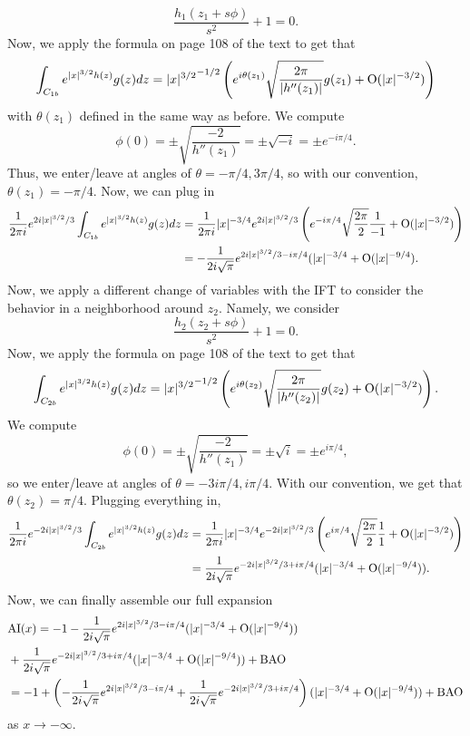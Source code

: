 \documentclass{article}
\begin{document}
\[
\frac{h_1(z_1+s\phi)}{s^2}+1=0.
\]
Now, we apply the formula on page 108 of the text to get that 
\[
\int_{C_{1b}}e^{|x|^{3/2}h(z)}g(z)dz={|x|^{3/2}}^{-1/2}\left(e^{i\theta(z_1)}\sqrt{\frac{2\pi}{|h''(z_1)|}}g(z_1)+\operatorname{O}(|x|^{-3/2})\right)
\]
with $\theta(z_1)$ defined in the same way as before. We compute
\[
\phi(0)=\pm\sqrt{\frac{-2}{h''(z_1)}}=\pm\sqrt{-i}=\pm e^{-i\pi/4}.
\]
Thus, we enter/leave at angles of $\theta=-\pi/4,3\pi/4$, so with our convention, $\theta(z_1)=-\pi/4$. Now, we can plug in
\begin{align*}
\frac{1}{2\pi i}e^{2i|x|^{3/2}/3}\int_{C_{1b}}e^{|x|^{3/2}h(z)}g(z)dz&=\frac{1}{2\pi i}|x|^{-3/4}e^{2i|x|^{3/2}/3}\left(e^{-i\pi/4}\sqrt{\frac{2\pi}{2}}\frac{1}{-1}+\operatorname{O}(|x|^{-3/2})\right)\\&=
-\frac{1}{2i\sqrt{\pi}}e^{2i|x|^{3/2}/3-i\pi/4}(|x|^{-3/4}+\operatorname{O}(|x|^{-9/4}).
\end{align*}
Now, we apply a different change of variables with the IFT to consider the behavior in a neighborhood around $z_2$. Namely, we consider 
\[
\frac{h_2(z_2+s\phi)}{s^2}+1=0.
\]
Now, we apply the formula on page 108 of the text to get that 
\[
\int_{C_{2b}}e^{|x|^{3/2}h(z)}g(z)dz={|x|^{3/2}}^{-1/2}\left(e^{i\theta(z_2)}\sqrt{\frac{2\pi}{|h''(z_2)|}}g(z_2)+\operatorname{O}(|x|^{-3/2})\right).
\]
We compute 
\[
\phi(0)=\pm\sqrt{\frac{-2}{h''(z_1)}}=\pm\sqrt{i}=\pm e^{i\pi/4},
\]
so we enter/leave at angles of $\theta=-3i\pi/4,i\pi/4$. With our convention, we get that $\theta(z_2)=\pi/4$. Plugging everything in,
\begin{align*}
\frac{1}{2\pi i}e^{-2i|x|^{3/2}/3}\int_{C_{2b}}e^{|x|^{3/2}h(z)}g(z)dz&=\frac{1}{2\pi i}|x|^{-3/4}e^{-2i|x|^{3/2}/3}\left(e^{i\pi/4}\sqrt{\frac{2\pi}{2}}\frac{1}{1}+\operatorname{O}(|x|^{-3/2})\right)\\&=
\frac{1}{2i\sqrt{\pi}}e^{-2i|x|^{3/2}/3+i\pi/4}(|x|^{-3/4}+\operatorname{O}(|x|^{-9/4})).
\end{align*}
Now, we can finally assemble our full expansion
\begin{align*}
&\mathrm{AI}(x)=-1-\frac{1}{2i\sqrt{\pi}}e^{2i|x|^{3/2}/3-i\pi/4}(|x|^{-3/4}+\operatorname{O}(|x|^{-9/4}))\\&+\frac{1}{2i\sqrt{\pi}}e^{-2i|x|^{3/2}/3+i\pi/4}(|x|^{-3/4}+\operatorname{O}(|x|^{-9/4}))+\text{BAO}\\&=
-1+\left(-\frac{1}{2i\sqrt{\pi}}e^{2i|x|^{3/2}/3-i\pi/4}+\frac{1}{2i\sqrt{\pi}}e^{-2i|x|^{3/2}/3+i\pi/4}\right)(|x|^{-3/4}+\operatorname{O}(|x|^{-9/4}))+\text{BAO}
\end{align*}
as $x\to-\infty$.
\end{document}
